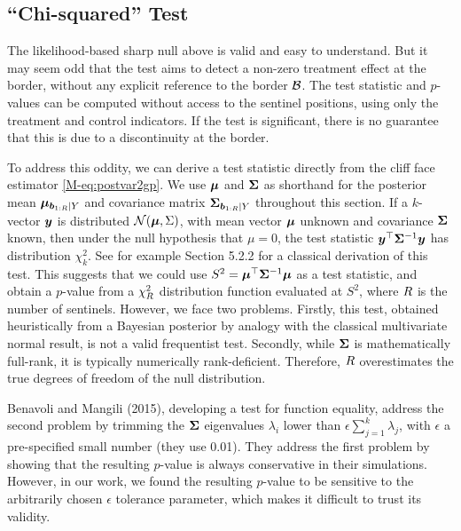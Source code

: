 \documentclass[letter,12pt]{article}
\begin{document}
\subsection{``Chi-squared'' Test}
The likelihood-based sharp null above is valid and easy to understand.
But it may seem odd that the test aims to detect a non-zero treatment effect at the border, without any explicit reference to the border \(\mathcal{B}\).
The test statistic and \(p\)-values can be computed without access to the sentinel positions, using only the treatment and control indicators.
If the test is significant, there is no guarantee that this is due to a discontinuity at the border.

To address this oddity, we can derive a test statistic directly from the cliff face estimator \autoref*{M-eq:postvar2gp}.
We use \(\bm{\mu}\) and \(\bm{\Sigma}\) as shorthand for the posterior mean \(\bm{\mu}_{\bm{b}_{1:R} \mid Y}\)
and covariance matrix \(\bm{\Sigma}_{\bm{b}_{1:R} \mid Y}\) throughout this section.
If a \(k\)-vector \(\bm{y}\) is distributed \(\normal\del{\muvec, \Sigma}\), with mean vector \(\bm{\mu}\) unknown and covariance \(\bm{\Sigma}\) known, then under the null hypothesis that \(\mu=0\), the test statistic \(\bm{y}^{\top} \bm{\Sigma}^{-1} \bm{y}\) has distribution \(\chi^2_k\).
See for example \cite{rencher2003methods} Section 5.2.2 for a classical derivation of this test.
This suggests that we could use \(S^2=\bm{\mu}^{\top} \bm{\Sigma}^{-1} \bm{\mu}\) as a test statistic,
and obtain a \(p\)-value from a \(\chi^2_R\) distribution function evaluated at \(S^2\), where \(R\) is the number of sentinels.
However, we face two problems.
Firstly, this test, obtained heuristically from a Bayesian posterior by analogy with the classical multivariate normal result, is not a valid frequentist test.
Secondly, while \(\bm{\Sigma}\) is mathematically full-rank, it is typically numerically rank-deficient.
Therefore, \(R\) overestimates the true degrees of freedom of the null distribution.

Benavoli and Mangili (2015), developing a test for function equality, address the second problem by trimming the \(\bm{\Sigma}\) eigenvalues \(\lambda_i\) lower than \(\epsilon \sum_{j=1}^k \lambda_j\), with \(\epsilon\) a pre-specified small number (they use 0.01).
They address the first problem by showing that the resulting \(p\)-value is always conservative in their simulations.
However, in our work, we found the resulting \(p\)-value to be sensitive to the arbitrarily chosen \(\epsilon\) tolerance parameter, which makes it difficult to trust its validity.
\end{document}
